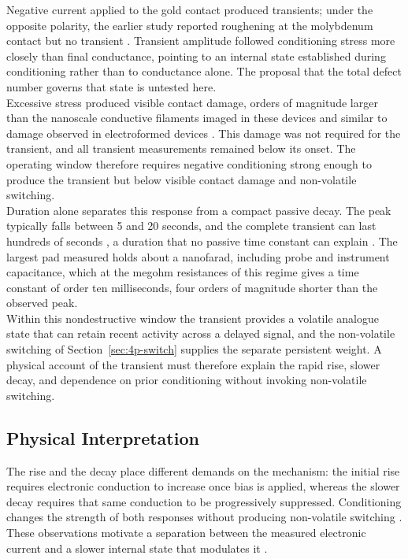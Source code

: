 \noindent Negative current applied to the gold contact produced transients; under the opposite polarity, the
earlier study reported roughening at the molybdenum contact but no transient \cite{mannion2022current}. Transient
amplitude followed conditioning stress more closely than final conductance, pointing to an internal state
established during conditioning rather than to conductance alone. The proposal that the total defect number
governs that state \cite{el2007ionic} is untested here.\\

\noindent Excessive stress produced visible contact damage, orders of magnitude larger than the nanoscale conductive
filaments imaged in these devices \cite{buckwell2015conductance} and similar to damage observed in electroformed
devices \cite{waser1990dcI, waser1990dcII}. This damage was not required for the transient, and all transient
measurements remained below its onset. The operating window therefore requires negative conditioning strong enough to
produce the transient but below visible contact damage and non-volatile switching.\\

\noindent Duration alone separates this response from a compact passive  decay. The
peak typically falls between 5 and 20 seconds, and the complete transient can last hundreds of seconds
\cite{saha2001transient}, a duration that no passive  time constant can explain
\cite{el2006space}. The largest pad measured holds about a nanofarad, including probe and instrument capacitance,
which at the megohm resistances of this regime gives a time constant of order ten milliseconds, four orders of
magnitude shorter than the observed peak.\\

\noindent Within this nondestructive window the transient provides a volatile analogue state that can retain recent
activity across a delayed signal, and the non-volatile switching of Section~\ref{sec:4p-switch} supplies the separate
persistent weight. A physical account of the transient must therefore explain the rapid rise, slower decay, and
dependence on prior conditioning without invoking non-volatile switching.

\subsection[Physical Interpretation]{Physical Interpretation}

\noindent The rise and the decay place different demands on the mechanism: the initial rise requires electronic
conduction to increase once bias is applied, whereas the slower decay requires that same conduction to be
progressively suppressed. Conditioning changes the strength of both responses without producing non-volatile
switching \cite{mannion2022current, mannion2023unipolar}. These observations motivate a separation between the
measured electronic current and a slower internal state that modulates it
\cite{kim2015secondorder, du2017metal}.\\

